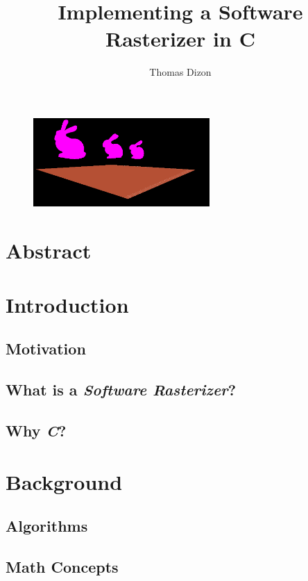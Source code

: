 \documentclass{article}
\author{Thomas Dizon}
\title{Implementing a Software Rasterizer in C}
\begin{document}
\maketitle

\begin{figure}[h]
	\centering
	\includegraphics[width=0.6\textwidth]{scene.png}
	\caption{}
\end{figure}

\newpage

\tableofcontents

\newpage

\section{Abstract}

\section{Introduction}

\subsection{Motivation}
\subsection{What is a \textit{Software Rasterizer}?}
\subsection{Why \textit{C}?}

\section{Background}
\subsection{Algorithms}
\subsection{Math Concepts}
\end{document}
